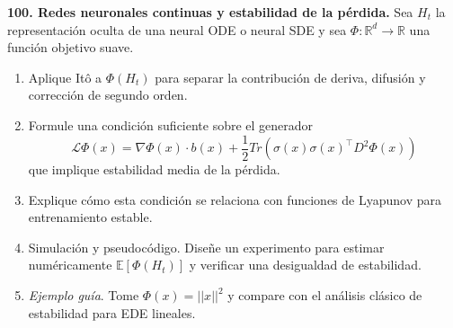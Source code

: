 \documentclass[11pt, letterpaper]{article}
\begin{document}
\newpage

\begin{ejercicio}
    \textbf{100. Redes neuronales continuas y estabilidad de la pérdida.} Sea $H_{t}$ la representación oculta de una neural ODE o neural SDE y sea $\Phi:\mathbb{R}^{d}\rightarrow\mathbb{R}$ una función objetivo suave.
    \begin{enumerate}
        \item Aplique Itô a $\Phi(H_{t})$ para separar la contribución de deriva, difusión y corrección de segundo orden.
        \item Formule una condición suficiente sobre el generador
        \[ \mathcal{L}\Phi(x)=\nabla\Phi(x)\cdot b(x)+\frac{1}{2}Tr(\sigma(x)\sigma(x)^{\top}D^{2}\Phi(x)) \]
        que implique estabilidad media de la pérdida.
        \item Explique cómo esta condición se relaciona con funciones de Lyapunov para entrenamiento estable.
        \item Simulación y pseudocódigo. Diseñe un experimento para estimar numéricamente $\mathbb{E}[\Phi(H_{t})]$ y verificar una desigualdad de estabilidad.
        \item \textit{Ejemplo guía}. Tome $\Phi(x)=||x||^{2}$ y compare con el análisis clásico de estabilidad para EDE lineales.
    \end{enumerate}
\end{ejercicio}

\vspace{5mm}
\end{document}
